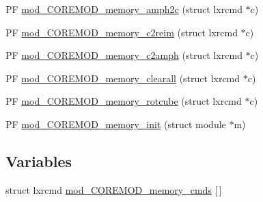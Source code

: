 \begin{DoxyCompactItemize}
\item 
P\+F \hyperlink{src_2COREMOD__memory_2COREMOD__memory-util_8c_abceffdcf049bab39e5757955893f11c5}{mod\+\_\+\+C\+O\+R\+E\+M\+O\+D\+\_\+memory\+\_\+amph2c} (struct lxrcmd $\ast$c)
\item 
P\+F \hyperlink{src_2COREMOD__memory_2COREMOD__memory-util_8c_ae37ffb77b7ef8d398d7c6b3bd0586495}{mod\+\_\+\+C\+O\+R\+E\+M\+O\+D\+\_\+memory\+\_\+c2reim} (struct lxrcmd $\ast$c)
\item 
P\+F \hyperlink{src_2COREMOD__memory_2COREMOD__memory-util_8c_ab9d70c426dda1c8fa072c7969ddb161d}{mod\+\_\+\+C\+O\+R\+E\+M\+O\+D\+\_\+memory\+\_\+c2amph} (struct lxrcmd $\ast$c)
\item 
P\+F \hyperlink{src_2COREMOD__memory_2COREMOD__memory-util_8c_a7bcce1b7da3734bf52c1c12b74d2b746}{mod\+\_\+\+C\+O\+R\+E\+M\+O\+D\+\_\+memory\+\_\+clearall} (struct lxrcmd $\ast$c)
\item 
P\+F \hyperlink{src_2COREMOD__memory_2COREMOD__memory-util_8c_a6c1e41bcef306b883c1f93eb1334d24c}{mod\+\_\+\+C\+O\+R\+E\+M\+O\+D\+\_\+memory\+\_\+rotcube} (struct lxrcmd $\ast$c)
\item 
P\+F \hyperlink{src_2COREMOD__memory_2COREMOD__memory-util_8c_aa5bc0cd7000dafd06d808ebcf832b0e8}{mod\+\_\+\+C\+O\+R\+E\+M\+O\+D\+\_\+memory\+\_\+init} (struct module $\ast$m)
\end{DoxyCompactItemize}
\subsection*{Variables}
\begin{DoxyCompactItemize}
\item 
struct lxrcmd \hyperlink{src_2COREMOD__memory_2COREMOD__memory-util_8c_a049011604b9403caffa7a6fa0538ce27}{mod\+\_\+\+C\+O\+R\+E\+M\+O\+D\+\_\+memory\+\_\+cmds} \mbox{[}$\,$\mbox{]}
\end{DoxyCompactItemize}


